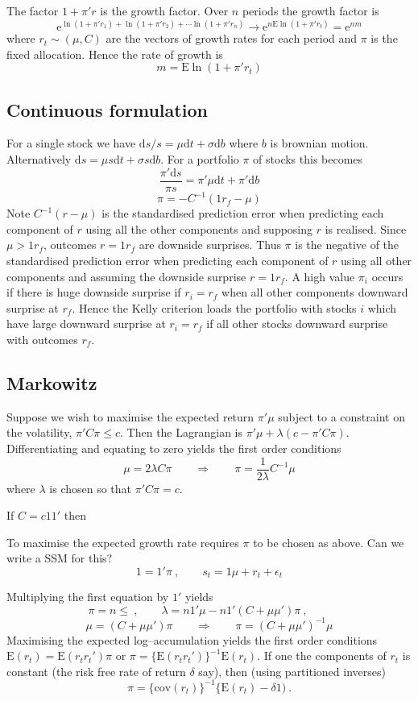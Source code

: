 \documentclass[authoryear]{elsarticle}
\newcommand{\E}{\mathrm{E}}
\newcommand{\e}{\mathrm{e}}
\newcommand{\cov}{\mathrm{cov}}
\newcommand{\eps}{\epsilon}
\newcommand{\de}{\mathrm{d}}
\newcommand{\cq}{\ , \qquad}
\begin{document}
The factor $1+\pi'r$ is the growth factor.   Over $n$ periods the growth factor is
$$
\e^{\ln(1+\pi'r_1)+\ln(1+\pi'r_2)+\cdots \ln(1+\pi'r_n)} \rightarrow \e^{n\E\ln(1+ \pi'r_t)} = \e^{nm}
$$
where $r_t\sim(\mu,C)$ are the vectors of growth rates for each period and $\pi$ is the fixed allocation.   Hence the rate of growth is
$$
m=\E\ln(1+\pi'r_t) 
$$

\subsection{Continuous formulation}
For a single stock we have $\de s/s = \mu\de t + \sigma\de b$ where $b$ is brownian motion.  Alternatively 
$\de s=\mu s\de t + \sigma s\de b$.    For a portfolio $\pi$ of stocks this becomes
$$
\frac{\pi'\de s}{\pi s} =\pi'\mu\de t + \pi'\de b
$$
$$
\pi=-C^{-1}(1r_f-\mu)
$$
Note $C^{-1}(r-\mu)$ is the standardised prediction error when predicting each component of $r$ using all the other components and supposing $r$ is realised.   Since $\mu>1r_f$,  outcomes $r=1r_f$ are downside surprises.
Thus  $\pi$ is the negative of the standardised prediction error when predicting each component of $r$ using all other components and assuming the downside surprise $r=1r_f$.   A high value $\pi_i$ occurs if  there is huge downside surprise if $r_i=r_f$   when all other components  downward surprise at  $r_f$.    Hence the Kelly criterion loads the portfolio with stocks $i$ which have  large downward surprise at $r_i=r_f$ if all other stocks downward surprise with outcomes $r_f$.      



\subsection{Markowitz}

Suppose we wish to maximise the expected return $\pi'\mu$ subject to a constraint on the volatility, $\pi'C\pi\le c$.  Then the Lagrangian is 
$\pi'\mu +\lambda (c-\pi'C\pi)$.   Differentiating and equating to zero yields the first order conditions
$$
\mu = 2\lambda C\pi\qquad \Rightarrow\qquad \pi = \frac{1}{2\lambda} C^{-1}\mu 
$$
where $\lambda$ is chosen so that $\pi'C\pi=c$. 
 

 If $C=c11'$ then

To maximise the expected growth rate requires $\pi$ to be chosen as above.  Can we write a SSM for this?
$$
1=1'\pi\cq s_t=1\mu + r_t + \eps_t 
$$


Multiplying the first equation by $1'$ yields
$$
\pi=n\le \cq\lambda=n1'\mu - n1'(C+\mu\mu')\pi\cq  
$$
$$
\mu = (C+\mu\mu')\pi\qquad\Rightarrow\qquad \pi=(C+\mu\mu')^{-1}\mu
$$
Maximising the expected log--accumulation yields the first order conditions
$
\E(r_t) = \E(r_tr_t')\pi
$ or $\pi=\{\E(r_tr_t')\}^{-1}\E(r_t)$.  If one the components of $r_t$ is constant (the risk free rate of return $\delta$ say), then (using partitioned inverses)
$$
\pi = \{\cov(r_t)\}^{-1}\{\E(r_t)-\delta 1)\ .
$$
\end{document}
